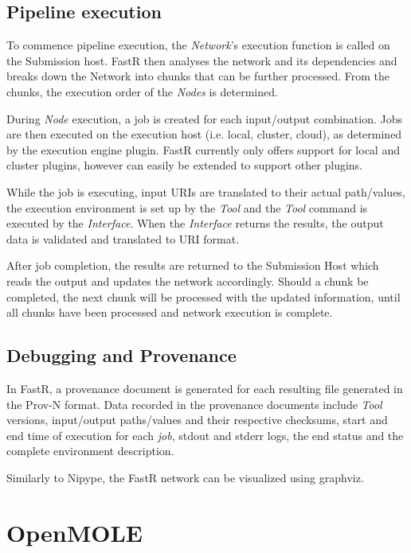 \documentclass{report}
\begin{document}
        \subsection{Pipeline execution}
        To commence pipeline execution, the \textit{Network}'s execution
function is called on the Submission host. FastR then analyses the network and
its dependencies and breaks
down the Network into chunks that can be further processed. From the chunks, the
execution order of the \textit{Nodes} is determined. 

During \textit{Node} execution, a job is created for each input/output
combination. Jobs are then executed on the execution host (i.e. local, cluster,
cloud), as determined by the execution engine plugin. FastR currently only
offers support for local and cluster plugins, however can easily be extended to
support other plugins. 

While the job is executing, input URIs are translated to their actual path/values,
the execution environment is set up by the \textit{Tool} and the \textit{Tool}
command is executed by the \textit{Interface}. When the \textit{Interface}
returns the results, the
output data is validated and translated to URI format. 

After job completion, the results are returned to the Submission Host which
reads the output and updates the network accordingly. Should a chunk be
completed, the next chunk will be processed with the updated information, until
all chunks have been processed and network execution is complete.

        \subsection{Debugging and Provenance}
        In FastR, a provenance document is generated for each resulting file
generated in the Prov-N format. Data recorded in the provenance documents include \textit{Tool}
versions, input/output paths/values and their respective checksums, start and
end time of execution for each \textit{job}, stdout and stderr logs, the end
status and the complete environment description.

    Similarly to Nipype, the FastR network can be visualized using graphviz.

         
    \section{OpenMOLE}
\end{document}
